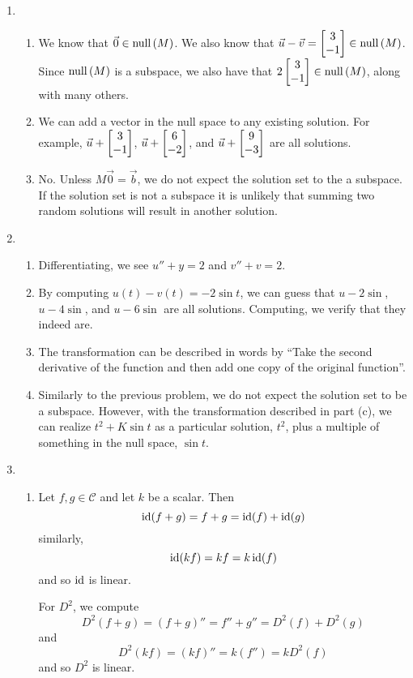 \begin{enumerate}
		\item \begin{enumerate}
			\item We know that $\vec 0\in \mathrm{null}\,(M)$. We also know that $\vec u-\vec v=\begin{bmatrix}3\\-1\end{bmatrix}\in \mathrm{null}\,(M)$. Since $\mathrm{null}\,(M)$
			is a subspace, we also have that $2\begin{bmatrix}3\\-1\end{bmatrix}\in\mathrm{null}\,(M)$, along with many others.
			\item We can add a vector in the null space to any existing solution. For example, $\vec u+\begin{bmatrix}3\\-1\end{bmatrix}$, $\vec u+\begin{bmatrix}6\\-2\end{bmatrix}$, 
			and $\vec u+\begin{bmatrix}9\\-3\end{bmatrix}$ are all solutions.
			\item No. Unless $M\vec 0=\vec b$, we do not expect the solution set to the a subspace. If the solution set is not a subspace
			it is unlikely that summing two random solutions will result in another solution.
		\end{enumerate}
		
		\item \begin{enumerate}
			\item Differentiating, we see $u''+y=2$ and $v''+v=2$.
			\item By computing $u(t)-v(t)=-2\sin t$, we can guess that $u-2\sin$, $u-4\sin$, and $u-6\sin$ are all solutions. Computing,
			we verify that they indeed are.
			\item The transformation can be described in words by ``Take the second derivative of the function and then add one copy of the original function''.
			\item Similarly to the previous problem, we do not expect the solution set to be a subspace. However, with the transformation described in
			part (c), we can realize $t^2+K\sin t$ as a particular solution, $t^2$, plus a multiple of something in the null space, $\sin t$.
		\end{enumerate}
		
		\item \begin{enumerate}
			\item Let $f,g\in \mathcal C$ and let $k$ be a scalar. Then 
			\[\operatorname{id}(f+g)=f+g=\operatorname{id}(f)+\operatorname{id}(g)\]
			similarly,
			\[
				\operatorname{id}(kf)=kf=k\operatorname{id}(f)
			\]
				and so $\operatorname{id}$ is linear.

			For $D^2$, we compute
			\[
				D^2(f+g)=(f+g)''=f''+g''=D^2(f)+D^2(g)
			\]
			 and 
			 \[
			 	D^2(kf)=(kf)''=k(f'')=kD^2(f)
			 \]
				and so $D^2$ is linear.


\end{enumerate}
\end{enumerate}
